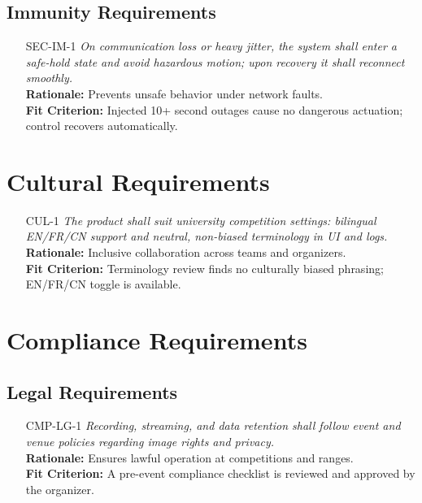 \documentclass[12pt]{article}
\begin{document}
\subsection{Immunity Requirements}
\begin{itemize}[leftmargin=*]
  \item[SEC-IM-1] \emph{On communication loss or heavy jitter, the system shall enter a safe-hold state and avoid hazardous motion; upon recovery it shall reconnect smoothly.}\\
  \textbf{Rationale:} Prevents unsafe behavior under network faults.\\
  \textbf{Fit Criterion:} Injected 10+ second outages cause no dangerous actuation; control recovers automatically.
\end{itemize}

\section{Cultural Requirements}
\begin{itemize}[leftmargin=*]
  \item[CUL-1] \emph{The product shall suit university competition settings: bilingual EN/FR/CN support and neutral, non-biased terminology in UI and logs.}\\
  \textbf{Rationale:} Inclusive collaboration across teams and organizers.\\
  \textbf{Fit Criterion:} Terminology review finds no culturally biased phrasing; EN/FR/CN toggle is available.
\end{itemize}

\section{Compliance Requirements}

\subsection{Legal Requirements}
\begin{itemize}[leftmargin=*]
  \item[CMP-LG-1] \emph{Recording, streaming, and data retention shall follow event and venue policies regarding image rights and privacy.}\\
  \textbf{Rationale:} Ensures lawful operation at competitions and ranges.\\
  \textbf{Fit Criterion:} A pre-event compliance checklist is reviewed and approved by the organizer.
\end{itemize}
\end{document}
